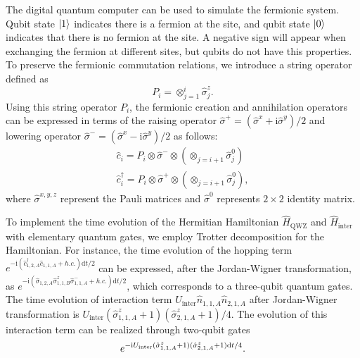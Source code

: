 \documentclass[longbibliography, aps, prx, amsmath, amssymb, amsfonts, twocolumn,superscriptaddress, footinbib]{revtex4-1}
\begin{document}
	The digital quantum computer can be used to simulate the fermionic system. 
	Qubit state $\ket{1}$ indicates there is a fermion at the site, and qubit state $\ket{0}$ indicates that there is no fermion at the site. 
	A negative sign will appear when exchanging the fermion at different sites, but qubits do not have this properties. 
	To preserve the fermionic commutation relations, we introduce a string operator defined as
	\begin{equation}
		P_i = \otimes_{j=1}^i\hat{\sigma}^z_j.
	\end{equation}
	Using this string operator $P_i$, the fermionic creation and annihilation operators can be expressed in terms of the raising operator $\hat{\sigma}^+=(\hat{\sigma}^x+\mathrm{i}\hat{\sigma}^y)/2$ and lowering operator $\hat{\sigma}^-=(\hat{\sigma}^x-\mathrm{i}\hat{\sigma}^y)/2$ as follows:
	\begin{equation}
		\begin{split}
			\hat{c}_i = P_i \otimes \hat{\sigma}^{-}\otimes (\otimes_{j=i+1}\hat{\sigma}^0_j)\\
			\hat{c}_i^{\dagger} = P_i \otimes \hat{\sigma}^{+}\otimes (\otimes_{j=i+1}\hat{\sigma}^0_j),
		\end{split}
	\end{equation}
	where $\hat{\sigma}^{x,y,z}$ represent the Pauli matrices and $\hat{\sigma}^0$ represents $2\times 2$ identity matrix.

	To implement the time evolution of the Hermitian Hamiltonian $\hat{H}_{\text{QWZ}}$ and $\hat{H}_{\text{inter}}$ with elementary quantum gates, we employ Trotter decomposition for the Hamiltonian. For instance, the time evolution of the hopping term $e^{-\mathrm{i}  (\hat{c}_{1,2,A}^{\dagger} \hat{c}_{1,1,A} +h.c.)\mathrm{d} t/2}$ can be expressed, after the Jordan-Wigner transformation, as $e^{-\mathrm{i} (\hat{\sigma}_{1,2,A} \hat{\sigma}^z_{1,1,B}\hat{\sigma}_{1,1,A}^{-} +h.c.)\mathrm{d} t /2}$, which corresponds to a three-qubit quantum gates.
	The time evolution of interaction term $ U_{\text{inter}} \hat{n}_{1, 1, A} \hat{n}_{2,1,A}$ after Jordan-Wigner transformation is $U_{\text{inter}} (\hat{\sigma}^z_{1,1,A}+1)(\hat{\sigma}^z_{2,1,A}+1)/4$. The evolution of this interaction term can be realized through two-qubit gates 
	\begin{equation}
		e^{-\mathrm{i} U_{\text{inter}} (\hat{\sigma}^z_{1,1,A}+1) (\hat{\sigma}^z_{2,1,A}+1) \mathrm{d}t/4 }. \notag
	\end{equation}
\end{document}
